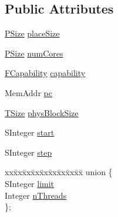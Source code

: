 \subsection*{Public Attributes}
\begin{DoxyCompactItemize}
\item 
\hyperlink{namespace_simulator_a4aa07bee2f34beac11abf48a8ccc47c4}{P\+Size} \hyperlink{struct_simulator_1_1drisc_1_1_family_a3c1851ecdf322bcbd74f70641542cf15}{place\+Size}
\item 
\hyperlink{namespace_simulator_a4aa07bee2f34beac11abf48a8ccc47c4}{P\+Size} \hyperlink{struct_simulator_1_1drisc_1_1_family_a23dc806c79918e98780e368e8aaf901b}{num\+Cores}
\item 
\hyperlink{namespace_simulator_a607aa9969bfe2711861ae21f42c37c59}{F\+Capability} \hyperlink{struct_simulator_1_1drisc_1_1_family_ad3ba7a5ee06366f2db60dd5616bc3bc2}{capability}
\item 
Mem\+Addr \hyperlink{struct_simulator_1_1drisc_1_1_family_ad7d47b382d467ed7d752fcbad7a598b2}{pc}
\item 
\hyperlink{namespace_simulator_aefe00209f3ea9f8e24874de522c3c3e7}{T\+Size} \hyperlink{struct_simulator_1_1drisc_1_1_family_abb5f31f2f00e8242f5d92ecdc57c05c3}{phys\+Block\+Size}
\item 
S\+Integer \hyperlink{struct_simulator_1_1drisc_1_1_family_ae17e6b563b6c192627d2261df124b5f5}{start}
\item 
S\+Integer \hyperlink{struct_simulator_1_1drisc_1_1_family_ad194800b2cb33191c069c77f7a2f9e46}{step}
\item 
\begin{tabbing}
xx\=xx\=xx\=xx\=xx\=xx\=xx\=xx\=xx\=\kill
union \{\\
\>SInteger \hyperlink{struct_simulator_1_1drisc_1_1_family_a7692587243181d8a1cfe78ccd8daa163}{limit}\\
\>Integer \hyperlink{struct_simulator_1_1drisc_1_1_family_af38b7adc0560eed9ecaa9cc252c59e3c}{nThreads}\\
\}; \\


\end{tabbing}
\end{DoxyCompactItemize}
